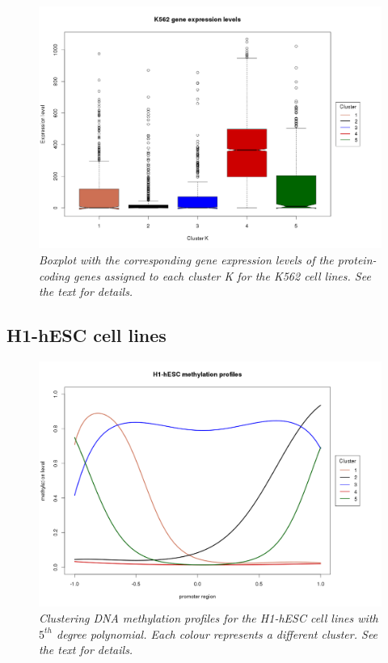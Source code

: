\begin{figure}[!ht]
\begin{center}
 \includegraphics[scale = 0.39]{images/k562MethProfBoxPlot}
\caption{\emph{Boxplot with the corresponding gene expression levels of the protein-coding genes assigned to each cluster K for the K562 cell lines. See the text for details.}}
\label{k562MethProfBoxPlot-pic}
\end{center}
\end{figure}


\subsection{H1-hESC cell lines}
\begin{figure}[!ht]
\begin{center}
 \includegraphics[scale = 0.39]{images/h1MethProfClusters}
\caption{\emph{Clustering DNA methylation profiles for the H1-hESC cell lines with $5^{th}$ degree polynomial. Each colour represents a different cluster. See the text for details.}}
\label{h1MethProfClusters-pic}
\end{center}
\end{figure}

